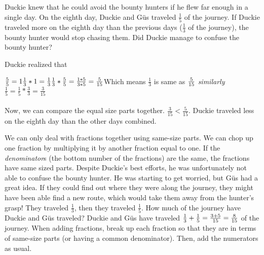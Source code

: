 {}
{Duckie knew that he could avoid the bounty hunters if he flew far enough in a single day. On the eighth day, Duckie and Güs traveled $\frac{1}{5}$ of the journey. If Duckie traveled more on the eighth day than the previous days ($\frac{1}{3}$ of the journey), the bounty hunter would stop chasing them. Did Duckie manage to confuse the bounty hunter?}
{Duckie realized that \begin{center}
    $\frac{5}{5}=1 \linebreak
    \frac{1}{3}\ast 1 = \frac{1}{3} \linebreak
    \frac{1}{3}\ast\frac{5}{5} = \frac{1\ast 5}{3\ast 5} = \frac{5}{15}\linebreak  $Which means $\frac{1}{3}$  is same as  $\frac{5}{15} \linebreak\linebreak$
    \textit{similarly}
   $ \frac{1}{5} = \frac{1}{5}\ast\frac{3}{3} = \frac{3}{15}$
\end{center}
\paragraph{} Now, we can compare the equal size parts together. $\frac{3}{15} < \frac{5}{15}$. Duckie traveled less on the eighth day than the other days combined.}
{We can only deal with fractions together using same-size parts. We can chop up one fraction by multiplying it by another fraction equal to one. If the \textit{denominator}s (the bottom number of the fractions) are the same, the fractions have same sized parts.}
{}
{Despite Duckie's best efforts, he was unfortunately not able to confuse the bounty hunter. He was starting to get worried, but Güs had a great idea. If they could find out where they were along the journey, they might have been able find a new route, which would take them away from the hunter's grasp! They traveled $\frac{1}{3}$, then they traveled $\frac{1}{5}$. How much of the journey have Duckie and Güs traveled?}
{Duckie and Güs have traveled $\frac{1}{3}+\frac{1}{5}\linebreak=\frac{3+5}{15}\linebreak=\frac{8}{15}$ of the journey.}
{When adding fractions, break up each fraction so that they are in terms of same-size parts (or having a common denominator). Then, add the numerators as usual.}
{}
